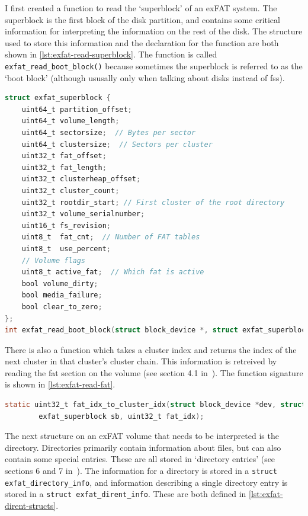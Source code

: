 \documentclass{article}
\begin{document}
I first created a function to read the `superblock' of an exFAT system. The
superblock is the first block of the disk partition, and contains some critical
information for interpreting the information on the rest of the disk. The
structure used to store this information and the declaration for the function
are both shown in \autoref{lst:exfat-read-superblock}. The function is called
\verb!exfat_read_boot_block()! because sometimes the superblock is referred to
as the `boot block' (although ususally only when talking about disks instead of
\glspl{fs}).

\begin{lstlisting}[language=C, caption={The structure used to represent the
                   exFAT superblock information, and the declaration of the
                   function used to read it}, float,
                   label={lst:exfat-read-superblock}]
struct exfat_superblock {
    uint64_t partition_offset;
    uint64_t volume_length;
    uint64_t sectorsize;  // Bytes per sector
    uint64_t clustersize;  // Sectors per cluster
    uint32_t fat_offset;
    uint32_t fat_length;
    uint32_t clusterheap_offset;
    uint32_t cluster_count;
    uint32_t rootdir_start; // First cluster of the root directory
    uint32_t volume_serialnumber;
    uint16_t fs_revision;
    uint8_t  fat_cnt;  // Number of FAT tables
    uint8_t  use_percent;
    // Volume flags
    uint8_t active_fat;  // Which fat is active
    bool volume_dirty;
    bool media_failure;
    bool clear_to_zero;
};
int exfat_read_boot_block(struct block_device *, struct exfat_superblock *);
\end{lstlisting}

There is also a function which takes a cluster index and returns the index of
the next cluster in that cluster's cluster chain. This information is retreived
by reading the \gls{fat} section on the volume (see section 4.1
in~\cite{exFAT-specs}). The function signature is shown in
\autoref{lst:exfat-read-fat}.

\begin{lstlisting}[language=C, caption={The function which is used to get the
                   cluster index of the next cluster in a cluster chain},
                   float, label={lst:exfat-read-fat}]
static uint32_t fat_idx_to_cluster_idx(struct block_device *dev, struct
        exfat_superblock sb, uint32_t fat_idx);
\end{lstlisting}

The next structure on an exFAT volume that needs to be interpreted is the
directory. Directories primarily contain information about files, but can also
contain some special entries. These are all stored in `directory entries' (see
sections 6 and 7 in~\cite{exFAT-specs}). The information for a directory is
stored in a \verb!struct exfat_directory_info!, and information describing a
single directory entry is stored in a \verb!struct exfat_dirent_info!. These
are both defined in \autoref{lst:exfat-dirent-structs}.
\end{document}
